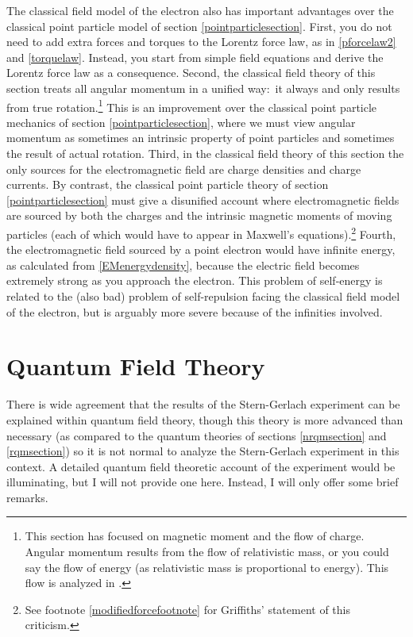 \documentclass[onecolumn,secnumarabic,amsmath,amssymb,balancelastpage,nofootinbib]{article}
\begin{document}
The classical field model of the electron also has important advantages over the classical point particle model of section \ref{pointparticlesection}.  First, you do not need to add extra forces and torques to the Lorentz force law, as in \eqref{pforcelaw2} and \eqref{torquelaw}.  Instead, you start from simple field equations and derive the Lorentz force law as a consequence.  Second, the classical field theory of this section treats all angular momentum in a unified way:\ it always and only results from true rotation.\footnote{This section has focused on magnetic moment and the flow of charge.  Angular momentum results from the flow of relativistic mass, or you could say the flow of energy (as relativistic mass is proportional to energy).  This flow is analyzed in \citet{ohanian, howelectronsspin}.}  This is an improvement over the classical point particle mechanics of section \ref{pointparticlesection}, where we must view angular momentum as sometimes an intrinsic property of point particles and sometimes the result of actual rotation.  Third, in the classical field theory of this section the only sources for the electromagnetic field are charge densities and charge currents.  By contrast, the classical point particle theory of section \ref{pointparticlesection} must give a disunified account where electromagnetic fields are sourced by both the charges and the intrinsic magnetic moments of moving particles (each of which would have to appear in Maxwell's equations).\footnote{See footnote \ref{modifiedforcefootnote} for Griffiths' statement of this criticism.}  Fourth, the electromagnetic field sourced by a point electron would have infinite energy, as calculated from \eqref{EMenergydensity}, because the electric field becomes extremely strong as you approach the electron.  This problem of self-energy is related to the (also bad) problem of self-repulsion facing the classical field model of the electron, but is arguably more severe because of the infinities involved.








\section{Quantum Field Theory}\label{qftsection}

There is wide agreement that the results of the Stern-Gerlach experiment can be explained within quantum field theory, though this theory is more advanced than necessary (as compared to the quantum theories of sections \ref{nrqmsection} and \ref{rqmsection}) so it is not normal to analyze the Stern-Gerlach experiment in this context.  A detailed quantum field theoretic account of the experiment would be illuminating, but I will not provide one here.  Instead, I will only offer some brief remarks.
\end{document}
